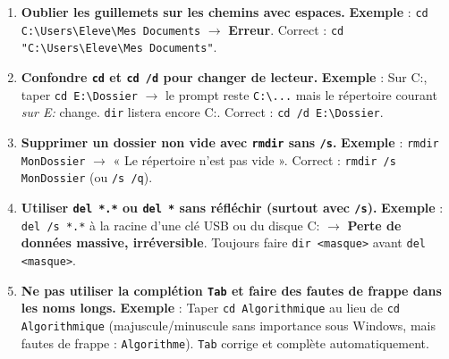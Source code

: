 \documentclass[11pt]{article}
\begin{document}
\begin{attention}
\begin{enumerate}
    \item \textbf{Oublier les guillemets sur les chemins avec espaces.}
    \textbf{Exemple} : \texttt{cd C:\textbackslash Users\textbackslash Eleve\textbackslash Mes Documents} $\to$ \textbf{Erreur}. Correct : \texttt{cd "C:\textbackslash Users\textbackslash Eleve\textbackslash Mes Documents"}.
    \item \textbf{Confondre \texttt{cd} et \texttt{cd /d} pour changer de lecteur.}
    \textbf{Exemple} : Sur C:, taper \texttt{cd E:\textbackslash Dossier} $\to$ le prompt reste \texttt{C:\textbackslash ...} mais le répertoire courant \emph{sur E:} change. \texttt{dir} listera encore C:. Correct : \texttt{cd /d E:\textbackslash Dossier}.
    \item \textbf{Supprimer un dossier non vide avec \texttt{rmdir} sans \texttt{/s}.}
    \textbf{Exemple} : \texttt{rmdir MonDossier} $\to$ « Le répertoire n'est pas vide ». Correct : \texttt{rmdir /s MonDossier} (ou \texttt{/s /q}).
    \item \textbf{Utiliser \texttt{del *.*} ou \texttt{del *} sans réfléchir (surtout avec \texttt{/s}).}
    \textbf{Exemple} : \texttt{del /s *.*} à la racine d'une clé USB ou du disque C: $\to$ \textbf{Perte de données massive, irréversible}. Toujours faire \texttt{dir <masque>} avant \texttt{del <masque>}.
    \item \textbf{Ne pas utiliser la complétion \texttt{Tab} et faire des fautes de frappe dans les noms longs.}
    \textbf{Exemple} : Taper \texttt{cd Algorithmique} au lieu de \texttt{cd Algorithmique} (majuscule/minuscule sans importance sous Windows, mais fautes de frappe : \texttt{Algorithme}). \texttt{Tab} corrige et complète automatiquement.
\end{enumerate}
\end{attention}
\end{document}
